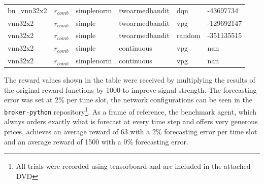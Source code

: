 \begin{table}[]
{\begin{tabular}{l|l|l|l|l|l}
            bn\_vnn32x2      &       $r_{comb}$       &       simplenorm             &   twoarmedbandit     & dqn                  & -43697734  \\
            vnn32x2          &       $r_{comb}$       &       simple                 &   twoarmedbandit     & vpg                  & -129692147 \\
            vnn32x2          &       $r_{comb}$       &       simple                 &   twoarmedbandit     & random               & -351135515 \\
            vnn32x2          &       $r_{comb}$       &       simple                 &   continuous         & vpg                  & nan        \\
            vnn32x2          &       $r_{comb}$       &       simplenorm             &   continuous         & vpg                  & nan        \\

        \end{tabular}
    }
\end{table}
The reward values shown in the table were received by multiplying the results of the original reward functions by 1000
to improve signal strength. The forecasting error was set at 2\% per time slot, the network configurations can be seen in
the \texttt{broker-python} repository\footnote{All trials were recorded using tensorboard and are included in the
attached DVD}.
As a frame of reference, the benchmark agent, which always orders exactly what is forecast at every time step and offers
very generous prices, achieves an average reward of 63 with a 2\% forecasting error per time slot and an average reward
of 1500 with a 0\% forecasting error.

